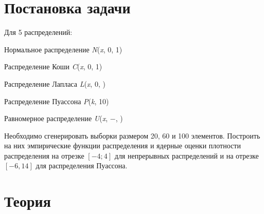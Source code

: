 \documentclass[a4paper]{article}
\begin{document}
\begin{center}
    \tableofcontents
\end{center}
\setcounter{page}{2}
\newpage

\begin{center}
    \listoffigures
\end{center}
\newpage

\section{Постановка задачи}
 Для 5 распределений:
 \begin{enumerate}
    \begin{item}
            Нормальное распределение \textit{N}(\normalsize{\textit{x}}, \normalsize{0}, \normalsize{1})
        \end{item}
        \begin{item}
            Распределение Коши \textit{C}(\normalsize{\textit{x}}, \normalsize{0}, \normalsize{1})
        \end{item}
        \begin{item}
            Распределение Лапласа \textit{L}(\normalsize{\textit{x}}, \normalsize{0}, \scriptsize{})
        \end{item} 
        \begin{item} 
            Распределение Пуассона \textit{P}(\normalsize{\textit{k}}, \normalsize{10})
        \end{item}
        \begin{item}
            Равномерное распределение \textit{U}(\normalsize{\textit{x}}, \normalsize{$-$}, \normalsize{})
        \end{item}
 \end{enumerate}
 Необходимо сгенерировать выборки размером 20, 60 и 100 элементов. Построить на них эмпирические функции распределения и ядерные оценки плотности распределения на отрезке $[-4; 4]$ для непрерывных распределений и на отрезке $[-6, 14]$ для распределения Пуассона.
 
\section{Теория}
\end{document}
